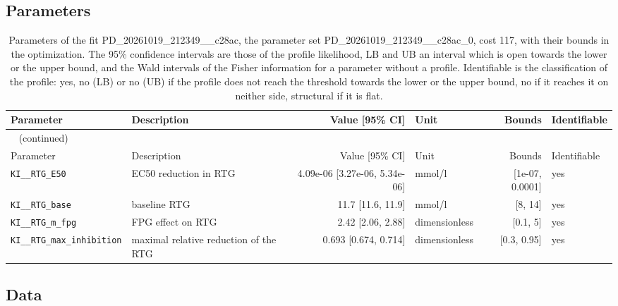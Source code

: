 \subsection{Parameters}

\begin{longtable}{llrlrl}
\caption{Parameters of the fit PD\_20261019\_212349\_\_c28ac, the parameter set PD\_20261019\_212349\_\_c28ac\_0, cost 117, with their bounds in the optimization. The 95\% confidence intervals are those of the profile likelihood, LB and UB an interval which is open towards the lower or the upper bound, and the Wald intervals of the Fisher information for a parameter without a profile. Identifiable is the classification of the profile: yes, no (LB) or no (UB) if the profile does not reach the threshold towards the lower or the upper bound, no if it reaches it on neither side, structural if it is flat.}\label{tab:parameters:PD_20261019_212349__c28ac} \\
\toprule
Parameter & Description & Value [95\% CI] & Unit & Bounds & Identifiable \\
\midrule
\endfirsthead
\multicolumn{6}{l}{\small\tablename~\thetable{} (continued)} \\
\toprule
Parameter & Description & Value [95\% CI] & Unit & Bounds & Identifiable \\
\midrule
\endhead
\bottomrule
\endlastfoot
\texttt{KI\_\_RTG\_E50} & EC50 reduction in RTG & 4.09e-06 [3.27e-06, 5.34e-06] & mmol/l & [1e-07, 0.0001] & yes \\
\texttt{KI\_\_RTG\_base} & baseline RTG & 11.7 [11.6, 11.9] & mmol/l & [8, 14] & yes \\
\texttt{KI\_\_RTG\_m\_fpg} & FPG effect on RTG & 2.42 [2.06, 2.88] & dimensionless & [0.1, 5] & yes \\
\texttt{KI\_\_RTG\_max\_inhibition} & maximal relative reduction of the RTG & 0.693 [0.674, 0.714] & dimensionless & [0.3, 0.95] & yes \\
\end{longtable}

\subsection{Data}

